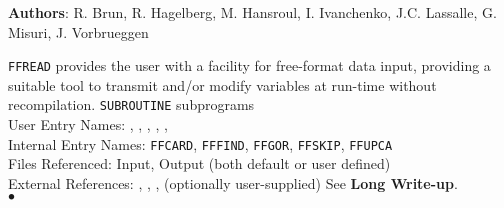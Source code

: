                             
                     
             
                   
{\bf Authors}: R. Brun, R. Hagelberg, M. Hansroul, I. Ivanchenko,
J.C. Lassalle, G. Misuri, J. Vorbrueggen \\[3mm]
\begin{center}
\end{center}
{\tt FFREAD} provides the user with a facility for free-format data
input, providing a suitable tool to transmit and/or modify
variables at run-time without recompilation.
\Structure
{\tt SUBROUTINE} subprograms \\
User Entry Names: , , ,
, , \\
Internal Entry Names: {\tt FFCARD}, {\tt FFFIND}, {\tt FFGOR},
{\tt FFSKIP}, {\tt FFUPCA}\\
Files Referenced: Input, Output (both default or user defined)\\
External References:
, , ,
 (optionally user-supplied)
\Usage
See {\bf Long Write-up}.
\\ $\bullet$
